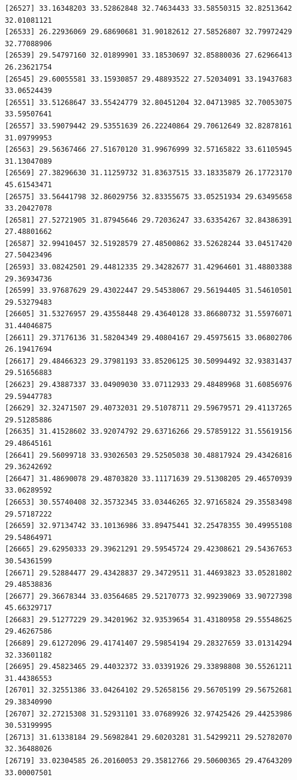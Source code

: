 \documentclass[
  letterpaper,
  DIV=11,
  numbers=noendperiod]{scrartcl}
\begin{document}
\begin{verbatim}
[26527] 33.16348203 33.52862848 32.74634433 33.58550315 32.82513642 32.01081121
[26533] 26.22936069 29.68690681 31.90182612 27.58526807 32.79972429 32.77088906
[26539] 29.54797160 32.01899901 33.18530697 32.85880036 27.62966413 26.23621754
[26545] 29.60055581 33.15930857 29.48893522 27.52034091 33.19437683 33.06524439
[26551] 33.51268647 33.55424779 32.80451204 32.04713985 32.70053075 33.59507641
[26557] 33.59079442 29.53551639 26.22240864 29.70612649 32.82878161 31.09799953
[26563] 29.56367466 27.51670120 31.99676999 32.57165822 33.61105945 31.13047089
[26569] 27.38296630 31.11259732 31.83637515 33.18335879 26.17723170 45.61543471
[26575] 33.56441798 32.86029756 32.83355675 33.05251934 29.63495658 33.20427078
[26581] 27.52721905 31.87945646 29.72036247 33.63354267 32.84386391 27.48801662
[26587] 32.99410457 32.51928579 27.48500862 33.52628244 33.04517420 27.50423496
[26593] 33.08242501 29.44812335 29.34282677 31.42964601 31.48803388 29.36934736
[26599] 33.97687629 29.43022447 29.54538067 29.56194405 31.54610501 29.53279483
[26605] 31.53276957 29.43558448 29.43640128 33.86680732 31.55976071 31.44046875
[26611] 29.37176136 31.58204349 29.40804167 29.45975615 33.06802706 26.19417694
[26617] 29.48466323 29.37981193 33.85206125 30.50994492 32.93831437 29.51656883
[26623] 29.43887337 33.04909030 33.07112933 29.48489968 31.60856976 29.59447783
[26629] 32.32471507 29.40732031 29.51078711 29.59679571 29.41137265 29.51285886
[26635] 31.41528602 33.92074792 29.63716266 29.57859122 31.55619156 29.48645161
[26641] 29.56099718 33.93026503 29.52505038 30.48817924 29.43426816 29.36242692
[26647] 31.48690078 29.48703820 33.11171639 29.51308205 29.46570939 33.06289592
[26653] 30.55740408 32.35732345 33.03446265 32.97165824 29.35583498 29.57187222
[26659] 32.97134742 33.10136986 33.89475441 32.25478355 30.49955108 29.54864971
[26665] 29.62950333 29.39621291 29.59545724 29.42308621 29.54367653 30.54361599
[26671] 29.52884477 29.43428837 29.34729511 31.44693823 33.05281802 29.48538836
[26677] 29.36678344 33.03564685 29.52170773 32.99239069 33.90727398 45.66329717
[26683] 29.51277229 29.34201962 32.93539654 31.43180958 29.55548625 29.46267586
[26689] 29.61272096 29.41741407 29.59854194 29.28327659 33.01314294 32.33601182
[26695] 29.45823465 29.44032372 33.03391926 29.33898808 30.55261211 31.44386553
[26701] 32.32551386 33.04264102 29.52658156 29.56705199 29.56752681 29.38340990
[26707] 32.27215308 31.52931101 33.07689926 32.97425426 29.44253986 30.53199995
[26713] 31.61338184 29.56982841 29.60203281 31.54299211 29.52782070 32.36488026
[26719] 33.02304585 26.20160053 29.35812766 29.50600365 29.47643209 33.00007501

\end{verbatim}
\end{document}
